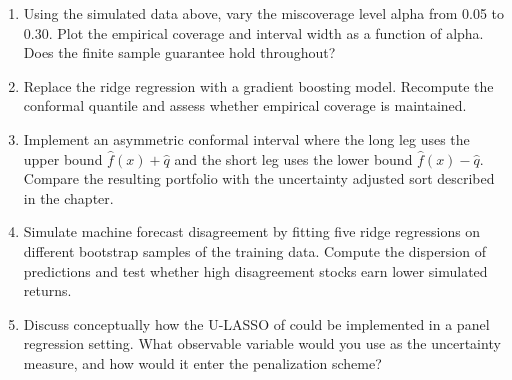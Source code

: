 \begin{enumerate}
\item Using the simulated data above, vary the miscoverage level alpha from 0.05 to 0.30. Plot the empirical coverage and interval width as a function of alpha. Does the finite sample guarantee hold throughout?
\item Replace the ridge regression with a gradient boosting model. Recompute the conformal quantile and assess whether empirical coverage is maintained.
\item Implement an asymmetric conformal interval where the long leg uses the upper bound $\hat{f}(x) + \hat{q}$ and the short leg uses the lower bound $\hat{f}(x) - \hat{q}$. Compare the resulting portfolio with the uncertainty adjusted sort described in the chapter.
\item Simulate machine forecast disagreement by fitting five ridge regressions on different bootstrap samples of the training data. Compute the dispersion of predictions and test whether high disagreement stocks earn lower simulated returns.
\item Discuss conceptually how the U-LASSO of \cite{chen2026uncertainty} could be implemented in a panel regression setting. What observable variable would you use as the uncertainty measure, and how would it enter the penalization scheme?
\end{enumerate}